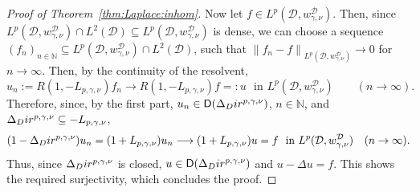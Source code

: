 \documentclass[10pt,a4paper]{amsart}
\newcommand{\Dir}{\textup{Dir}}
\newcommand{\N}{\ensuremath{\mathbb{N}}}
\newcommand{\calD}{\ensuremath{\mathcal{D}}}
\newcommand{\nrm}[1]{\left\lVert #1 \right\rVert}
\newcommand{\sfD}{\ensuremath{\mathsf{D}}}
\begin{document}
\begin{proof}[Proof of Theorem~\ref{thm:Laplace:inhom}]
Now let $f\in L^p(\calD,w_{\gamma,\nu}^\calD)$. Then, since $L^p(\calD,w_{\gamma,\nu}^\calD)\cap L^2(\calD)\subseteq L^p(\calD,w_{\gamma,\nu}^\calD)$ is dense, we can choose a sequence $(f_n)_{n\in\N}\subseteq L^p(\calD,w_{\gamma,\nu}^\calD)\cap L^2(\calD)$, such that $\nrm{f_n-f}_{L^p(\calD,w_{\gamma,\nu}^\calD)}\to 0$ for $n\to\infty$.  
Then, by the continuity of the resolvent,
\[
u_n:=R(1,-L_{p,\gamma,\nu})f_n\longrightarrow R(1,-L_{p,\gamma,\nu})f=:u\,\,\text{ in }L^p(\calD,w_{\gamma,\nu}^\calD)\qquad (n\to\infty).
\]
Therefore, since, by the first part, $u_n\in \sfD(\Delta_\Dir^{p,\gamma,\nu})$, $n\in\N$, and $\Delta_\Dir^{p,\gamma,\nu}\subseteq -L_{p,\gamma,\nu}$, 
\[
(1-\Delta_\Dir^{p,\gamma,\nu})u_n 
=
(1+L_{p,\gamma,\nu})u_n
\longrightarrow
(1+L_{p,\gamma,\nu})u 
= 
f
\,\,\text{ in }L^p(\calD,w_{\gamma,\nu}^\calD)\quad (n\to\infty).
\]
Thus, since $\Delta_\Dir^{p,\gamma,\nu}$ is closed, 
$u\in \sfD(\Delta_\Dir^{p,\gamma,\nu})$ and $u-\Delta u=f$.
This shows the required surjectivity, which concludes the proof.
\end{proof}
\end{document}
